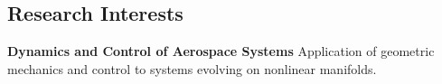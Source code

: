 \subsection*{Research Interests}
{}

\textbf{Dynamics and Control of Aerospace Systems}
Application of geometric mechanics and control to systems evolving on nonlinear manifolds.
